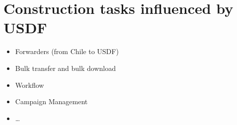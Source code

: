 \section{Construction tasks influenced by USDF}\label{sec:contr}


\begin{itemize}
\item Forwarders (from Chile to USDF)
\item Bulk transfer and bulk download
\item Workflow
\item Campaign Management
\item \ldots
\end{itemize}
